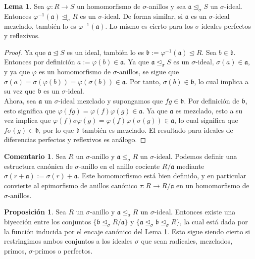 \documentclass[letterpaper]{article}
\def\a{\mathfrak{a}}
\def\b{\mathfrak{b}}
\def\s{\sigma}
\def\si{\unlhd_{\sigma}}
\newenvironment{bew}{\begin{proof}[Proof]}{\end{proof}}
\theoremstyle{definition}
\newtheorem{prop}[Satz]{Proposici\'{o}n}
\newtheorem{rem}[Satz]{Comentario}
\newtheorem{lem}[Satz]{Lema}
\begin{document}
\begin{lem}\label{bijmapping}
Sea $\varphi: R \rightarrow S$ un homomorfismo de $\sigma$-anillos y sea $\a \si S$ un $\s$-ideal. Entonces $\varphi^{-1}(\a) \si R$ es un $\sigma$-ideal. De forma similar, si $\a$ es un $\sigma$-ideal mezclado, tambi\'en lo es $\varphi^{-1}(\a)$. Lo mismo es cierto para los $\sigma$-ideales perfectos y reflexivos. \end{lem}
\begin{proof}
Ya que $\a \unlhd S$ es un ideal, tambi\'en lo es $\b := \varphi^{-1}(\a) \unlhd R$. Sea $b \in \b$. Entonces  por definici\'on $a:=\varphi(b)\in \a$. Ya que $\a \si S$ es un $\sigma$-ideal, $\sigma(a) \in \a$, y ya que $\varphi$ es un homomorfismo de $\sigma$-anillos, se sigue que $\sigma(a) = \sigma(\varphi(b)) = \varphi (\s (b)) \in \a$. Por tanto, $\sigma(b) \in \b$, lo cual implica a su vez que $\b$ es un $\sigma$-ideal.\\

Ahora, sea $\a$ un $\sigma$-ideal mezclado y supongamos que $fg \in \b$. Por definici\'on de $\b$, 
esto significa que $\varphi(fg) = \varphi(f) \varphi(g) \in \a$. Ya que $\a$ es mezclado, esto a su vez implica que $\varphi(f) \s \varphi(g) = \varphi(f) \varphi(\s(g)) \in \a$, lo cual significa que $f\s(g) \in \b$, por lo que $\b$ tambi\'en es mezclado.
El resultado para ideales de diferencias perfectos y reflexivos es an\'alogo.
\end{proof}


\begin{rem}
Sea $R$ un $\sigma$-anillo y $\a \si R$ un $\sigma$-ideal. Podemos definir una estructura can\'onica de $\sigma$-anillo en el anillo cociente $R/\a$ mediante $\s(r+\a):= \s(r) + \a$. 
Este homomorfismo est\'a bien definido, y en particular convierte al epimorfismo de anillos can\'onico $\tau: R \rightarrow R/\a$ en un homomorfismo de $\sigma$-anillos.
\end{rem}

\begin{prop}\label{bijideals}
Sea $R$ un $\sigma$-anillo y $\a \si R$ un $\sigma$-ideal. Entonces existe una biyecci\'on entre los conjuntos $\{ \b \si R/\a \}$ y $\{ \a \si \b \si R \}$, la cual est\'a dada por la funci\'on inducida por el encaje can\'onico del Lema \ref{bijmapping}. 
Esto sigue siendo cierto si restringimos ambos conjuntos a los ideales $\s$ que sean radicales, mezclados, primos, $\sigma$-primos o perfectos.
\end{prop}
\end{document}
